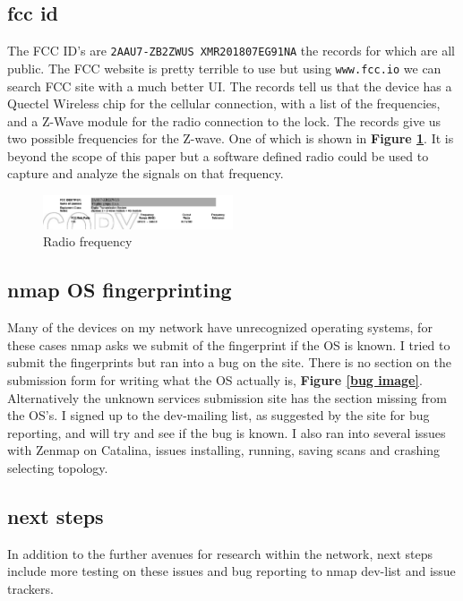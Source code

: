 \documentclass[10pt]{article}
\begin{document}
\subsection*{fcc id}
The FCC ID's are \verb|2AAU7-ZB2ZWUS XMR201807EG91NA| the records for which are all public. The FCC website is pretty terrible to use but using
\verb|www.fcc.io| we can search FCC site with a much better UI. The records tell us that the device has a Quectel Wireless chip for the cellular connection, with a list of
the frequencies, and a Z-Wave module for the radio connection to the lock.\cite{fcc} The records give us two possible frequencies for the Z-wave. One of which is shown in
\textbf{Figure \ref{radio image}}. It is beyond the scope of this paper but a software defined radio could be used to capture and analyze the signals on that frequency.

\begin{figure}[H]
\centering
\includegraphics[width=0.5\textwidth]{radio.png}
\caption{Radio frequency}\label{radio image}
\end{figure}

\subsection*{nmap OS fingerprinting}
Many of the devices on my network have unrecognized operating systems, for these cases nmap asks we submit of the fingerprint if the OS is known. I tried to submit the 
fingerprints but ran into a bug on the site. There is no section on the submission form for writing what the OS actually is, \textbf{Figure \ref{bug image}}. 
Alternatively the unknown services submission site has the section missing from the OS's. I signed up to the dev-mailing list, as suggested by the site for bug 
reporting, and will try and see if the bug is known.\cite{submit} I also ran into several issues with Zenmap on Catalina, issues installing, running, saving scans and crashing
selecting topology.

\medskip

\subsection*{next steps}
In addition to the further avenues for research within the network, next steps include more testing on these issues and bug reporting to nmap dev-list and issue
trackers.
\end{document}
